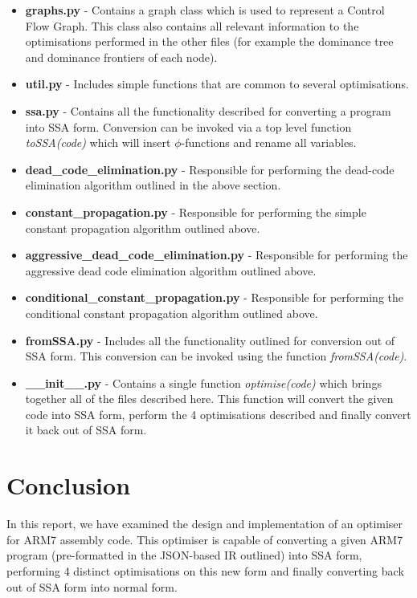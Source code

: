 \documentclass[a4paper,10pt]{report}
\begin{document}
\begin{itemize}
\item \textbf{graphs.py} - Contains a graph class which is used to represent a Control Flow Graph. This class also contains all relevant
                  information to the optimisations performed in the other files (for example the dominance tree and dominance
                  frontiers of each node).
                  
\item \textbf{util.py} - Includes simple functions that are common to several optimisations.

\item \textbf{ssa.py} - Contains all the functionality described for converting a program into SSA form. Conversion can be invoked via a
               top level function \textit{toSSA(code)} which will insert \(\phi\)-functions and rename all variables.
               
\item \textbf{dead\_code\_elimination.py} - Responsible for performing the dead-code elimination algorithm outlined in the above section.

\item \textbf{constant\_propagation.py} - Responsible for performing the simple constant propagation algorithm outlined above.

\item \textbf{aggressive\_dead\_code\_elimination.py} - Responsible for performing the aggressive dead code elimination algorithm outlined above.

\item \textbf{conditional\_constant\_propagation.py} - Responsible for performing the conditional constant propagation algorithm outlined above.

\item \textbf{fromSSA.py} - Includes all the functionality outlined for conversion out of SSA form. This conversion can be invoked using the
                   function \textit{fromSSA(code)}.

\item \textbf{\_\_init\_\_.py} - Contains a single function \textit{optimise(code)} which brings together all of the files described here. This
                    function will convert the given code into SSA form, perform the 4 optimisations described and finally convert it
                    back out of SSA form.
\end{itemize}

\chapter{Conclusion}
In this report, we have examined the design and implementation of an optimiser for ARM7 assembly code. This optimiser is capable of
converting a given ARM7 program (pre-formatted in the JSON-based IR outlined) into SSA form, performing 4 distinct optimisations on
this new form and finally converting back out of SSA form into normal form. 
\end{document}
